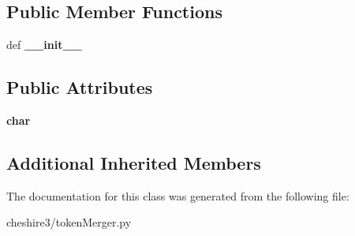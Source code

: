 \subsection*{Public Member Functions}
\begin{DoxyCompactItemize}
\item 
\hypertarget{classcheshire3_1_1token_merger_1_1_range_token_merger_a6b558f6912635260a7956ddb1c2d9208}{def {\bfseries \-\_\-\-\_\-init\-\_\-\-\_\-}}\label{classcheshire3_1_1token_merger_1_1_range_token_merger_a6b558f6912635260a7956ddb1c2d9208}

\end{DoxyCompactItemize}
\subsection*{Public Attributes}
\begin{DoxyCompactItemize}
\item 
\hypertarget{classcheshire3_1_1token_merger_1_1_range_token_merger_a0e8ea0568c650df358a51aec264cb59a}{{\bfseries char}}\label{classcheshire3_1_1token_merger_1_1_range_token_merger_a0e8ea0568c650df358a51aec264cb59a}

\end{DoxyCompactItemize}
\subsection*{Additional Inherited Members}


The documentation for this class was generated from the following file\-:\begin{DoxyCompactItemize}
\item 
cheshire3/token\-Merger.\-py\end{DoxyCompactItemize}
